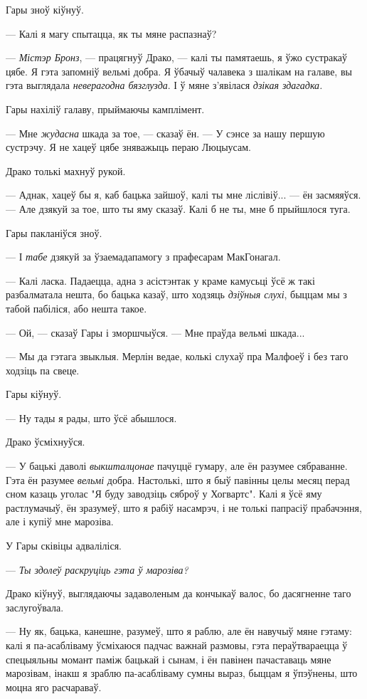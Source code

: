 Гары зноў кіўнуў.

--- Калі я магу спытацца, як ты мяне распазнаў?

--- \emph{Містэр Бронз}, --- працягнуў Драко, --- калі ты памятаешь, я ўжо 
сустракаў цябе. Я гэта запомніў вельмі добра. Я ўбачыў чалавека з шалікам
на галаве, вы гэта выглядала \emph{неверагодна бязглузда}. І ў мяне з'явілася
\emph{дзікая здагадка.}

Гары нахіліў галаву, прыймаючы камплімент. 

--- Мне \emph{жудасна} шкада за тое, --- сказаў ён. --- У сэнсе за нашу 
першую сустрэчу. Я не хацеў цябе зняважыць пераю Люцыусам.

Драко толькі махнуў рукой.

--- Аднак, хацеў бы я, каб бацька зайшоў, калі ты мне ліслівіў... --- ён 
засмяяўся. --- Але дзякуй за тое, што ты яму сказаў. Калі б не ты, мне б 
прыйшлося туга.

Гары пакланіўся зноў.

--- І \emph{табе} дзякуй за ўзаемадапамогу з прафесарам МакГонагал.

--- Калі ласка. Падаецца, адна з асістэнтак у краме камусьці ўсё ж такі 
разбалматала нешта, бо бацька казаў, што ходзяць \emph{дзіўныя слухі}, 
быццам мы з табой пабіліся, або нешта такое.

--- Ой, --- сказаў Гары і зморшчыўся. --- Мне праўда вельмі шкада...

--- Мы да гэтага звыклыя. Мерлін ведае, колькі слухаў пра Малфоеў і без таго 
ходзіць па свеце.

Гары кіўнуў.

--- Ну тады я рады, што ўсё абышлося.

Драко ўсміхнуўся.

--- У бацькі даволі \emph{выкшталцонае} пачуццё гумару, але ён разумее 
сябраванне. Гэта ён разумее \emph{вельмі} добра. Настолькі, што я быў 
павінны целы месяц перад сном казаць уголас "Я буду заводзіць сяброў у Хогвартс".
Калі я ўсё яму растлумачыў, ён зразумеў, што я рабіў насамрэч, і не толькі 
папрасіў прабачэння, але і купіў мне марозіва.

У Гары сківіцы адваліліся.

--- \emph{Ты здолеў раскруціць гэта ў марозіва?}

Драко кіўнуў, выглядаючы задаволеным да кончыкаў валос, бо дасягненне таго
заслугоўвала. 

--- Ну як, бацька, канешне, разумеў, што я раблю, але ён навучыў мяне гэтаму:
калі я па-асабліваму ўсміхаюся падчас важнай размовы, гэта пераўтвараецца ў 
спецыяльны момант паміж бацькай і сынам, і ён павінен пачаставаць мяне марозівам,
інакш я зраблю па-асабліваму сумны выраз, быццам я ўпэўнены, што моцна яго
расчараваў.

